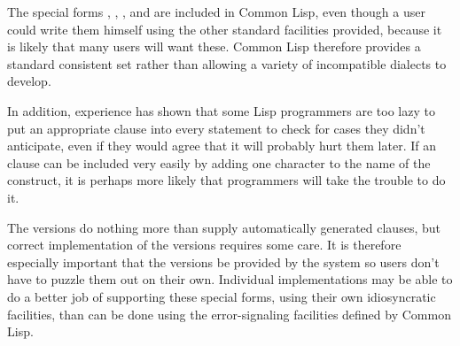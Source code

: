 \beforenoterule
\begin{rationale}
The special forms
, , , and 
are included in Common Lisp, even though a user
could write them himself using the other standard facilities provided,
because it is likely that many users will want these.
Common Lisp therefore provides
a standard consistent set rather than allowing
a variety of incompatible dialects to develop.

In addition, experience has shown that
some Lisp programmers are too lazy to put an appropriate
 clause into every  statement to
check for cases they
didn't anticipate, even if they would agree that it will probably 
hurt them later.  If an  clause can be included
very easily by adding one character to the name of the construct,
it is perhaps more likely that programmers will take the trouble to do it. 

The  versions do nothing more than supply
automatically generated  clauses, but correct
implementation of the  versions
requires some care.  It is therefore especially
important that the  versions be provided
by the system so users don't have to puzzle them out on
their own.  Individual implementations may be able to do a better job
of supporting these special forms,
using their own idiosyncratic facilities, than can be done
using the error-signaling facilities defined by Common Lisp.
\end{rationale}
\afternoterule
